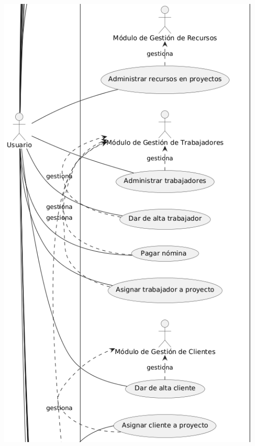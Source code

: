 \documentclass[protocolo.tex]{subfiles}
\begin{document}
\includegraphics[scale=0.7]{Imagenes/datafirept2.png}
\end{document}
